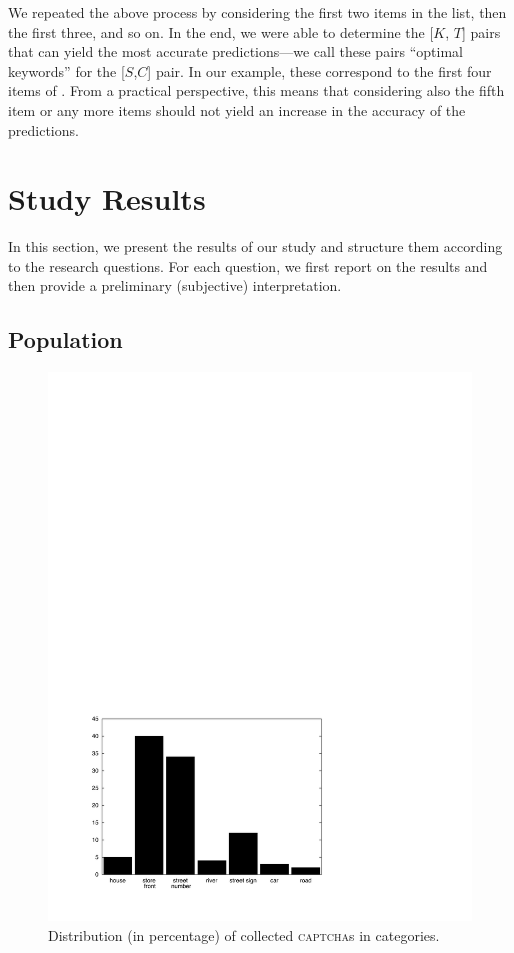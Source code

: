 \documentclass[sigconf,review,anonymous]{acmart}
\newcommand{\captchas}{\textsc{captcha}s\xspace}
\begin{document}
We repeated the above process by considering the first two items in the list, then the first three, and so on. In the end, we were able to determine the [$K$, $T$] pairs that can yield the most accurate predictions---we call these pairs ``optimal keywords'' for the [$S$,$C$] pair. In our example, these correspond to the first four items of . From a practical perspective, this means that considering also the fifth item or any more items should not yield an increase in the accuracy of the predictions. 

\section{Study Results}
\label{sec:StudyResults}

In this section, we present the results of our study and structure them according to the research questions. For each question, we first report on the results and then provide a preliminary (subjective) interpretation.

\subsection{Population}

\begin{figure}[t]
\centering
\includegraphics[width=\columnwidth]{images/captcha-distribution.pdf}
\caption{Distribution (in percentage) of collected \captchas in categories.}
\label{res-captcha-distribution}
\end{figure}
\end{document}
